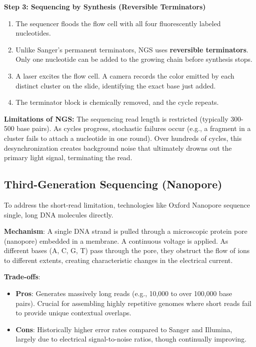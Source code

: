 \documentclass[11pt,a4paper]{article}
\begin{document}
\textbf{Step 3: Sequencing by Synthesis (Reversible Terminators)}
\begin{enumerate}
    \item The sequencer floods the flow cell with all four fluorescently labeled nucleotides. 
    \item Unlike Sanger's permanent terminators, NGS uses \textbf{reversible terminators}. Only one nucleotide can be added to the growing chain before synthesis stops.
    \item A laser excites the flow cell. A camera records the color emitted by each distinct cluster on the slide, identifying the exact base just added.
    \item The terminator block is chemically removed, and the cycle repeats.
\end{enumerate}

\textbf{Limitations of NGS:}
The sequencing read length is restricted (typically 300-500 base pairs). As cycles progress, stochastic failures occur (e.g., a fragment in a cluster fails to attach a nucleotide in one round). Over hundreds of cycles, this desynchronization creates background noise that ultimately drowns out the primary light signal, terminating the read.

\subsection{Third-Generation Sequencing (Nanopore)}
To address the short-read limitation, technologies like Oxford Nanopore sequence single, long DNA molecules directly.

\textbf{Mechanism}: A single DNA strand is pulled through a microscopic protein pore (nanopore) embedded in a membrane. A continuous voltage is applied. As different bases (A, C, G, T) pass through the pore, they obstruct the flow of ions to different extents, creating characteristic changes in the electrical current.

\textbf{Trade-offs}:
\begin{itemize}
    \item \textbf{Pros}: Generates massively long reads (e.g., 10,000 to over 100,000 base pairs). Crucial for assembling highly repetitive genomes where short reads fail to provide unique contextual overlaps.
    \item \textbf{Cons}: Historically higher error rates compared to Sanger and Illumina, largely due to electrical signal-to-noise ratios, though continually improving.
\end{itemize}
\end{document}
